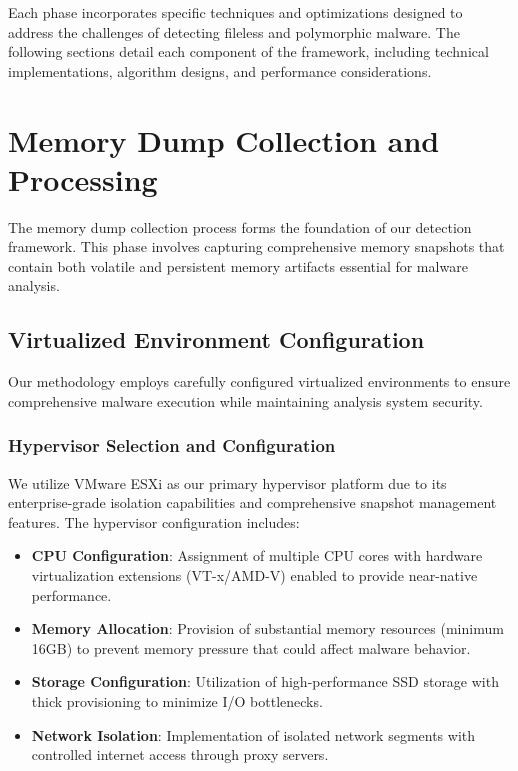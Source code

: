 Each phase incorporates specific techniques and optimizations designed to address the challenges of detecting fileless and polymorphic malware. The following sections detail each component of the framework, including technical implementations, algorithm designs, and performance considerations.

\section{Memory Dump Collection and Processing}
\label{sec:memory-dump-collection}

The memory dump collection process forms the foundation of our detection framework. This phase involves capturing comprehensive memory snapshots that contain both volatile and persistent memory artifacts essential for malware analysis.

\subsection{Virtualized Environment Configuration}
\label{subsec:environment-config}

Our methodology employs carefully configured virtualized environments to ensure comprehensive malware execution while maintaining analysis system security.

\subsubsection{Hypervisor Selection and Configuration}

We utilize VMware ESXi as our primary hypervisor platform due to its enterprise-grade isolation capabilities and comprehensive snapshot management features. The hypervisor configuration includes:

\begin{itemize}
    \item \textbf{CPU Configuration}: Assignment of multiple CPU cores with hardware virtualization extensions (VT-x/AMD-V) enabled to provide near-native performance.
    
    \item \textbf{Memory Allocation}: Provision of substantial memory resources (minimum 16GB) to prevent memory pressure that could affect malware behavior.
    
    \item \textbf{Storage Configuration}: Utilization of high-performance SSD storage with thick provisioning to minimize I/O bottlenecks.
    
    \item \textbf{Network Isolation}: Implementation of isolated network segments with controlled internet access through proxy servers.
\end{itemize}

